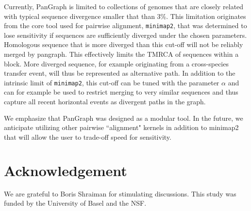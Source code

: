 \documentclass[aps,rmp,reprint,superscriptaddress,notitlepage,10pt]{revtex4-1}
\begin{document}
Currently, PanGraph is limited to collections of genomes that are closely related with typical sequence divergence smaller that than 3\%.
This limitation originates from the core tool used for pairwise alignment, \texttt{minimap2}, that was determined to lose sensitivity if sequences are sufficiently diverged under the chosen parameters.
Homologous sequence that is more diverged than this cut-off will not be reliably merged by pangraph.
This effectively limits the TMRCA of sequences within a block.
More diverged sequence, for example originating from a cross-species transfer event, will thus be represented as alternative path.
In addition to the intrinsic limit of \texttt{minimap2}, this cut-off can be tuned with the parameter $\alpha$ and can for example be used to restrict merging to very similar sequences and thus capture all recent horizontal events as divergent paths in the graph.

We emphasize that PanGraph was designed as a modular tool.
In the future, we anticipate utilizing other pairwise ``alignment" kernels in addition to minimap2 that will allow the user to trade-off speed for sensitivity.

\section*{Acknowledgement}
We are grateful to Boris Shraiman for stimulating discussions.
This study was funded by the University of Basel and the NSF.

{}
\end{document}

